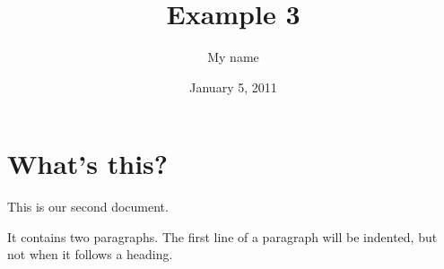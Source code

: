 \documentclass[a4paper,11pt]{article}
\begin{document}
\title{Example 3}
\author{My name}
\date{January 5, 2011}
\maketitle
\section{What's this?}
This        is   our
second document.

It contains two paragraphs. The first line of a paragraph will be
indented, but not when it follows a heading.
%
%
\end{document}
